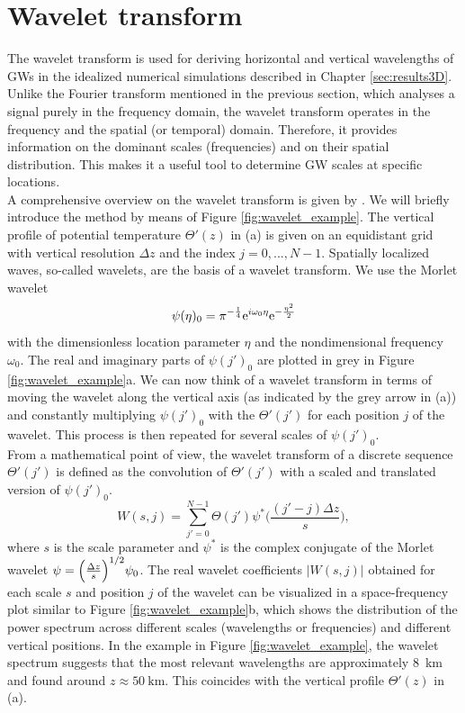 \section{Wavelet transform}
\label{sec:wavelet}
%
The wavelet transform is used for deriving horizontal and vertical wavelengths of GWs in the idealized numerical simulations described in Chapter \ref{sec:results3D}. Unlike the Fourier transform mentioned in the previous section, which analyses a signal purely in the frequency domain, the wavelet transform operates in the frequency and the spatial (or temporal) domain. Therefore, it provides information on the dominant scales (frequencies) and on their spatial distribution. This makes it a useful tool to determine GW scales at specific locations.\\

A comprehensive overview on the wavelet transform is given by \textcite{torrence_practical_1998}. We will briefly introduce the method by means of Figure \ref{fig:wavelet_example}. The vertical profile of potential temperature $\Theta'(z)$ in (a) is given on an equidistant grid with vertical resolution $\Delta z$ and the index $j=0,...,N-1$. Spatially localized waves, so-called wavelets, are the basis of a wavelet transform. We use the Morlet wavelet
\begin{equation}
    \psi(\eta)_0= \pi^{-\frac{1}{4}} {\rm e}^{i \omega_0 \eta}  {\rm e}^{-\frac{\eta^2}{2}}
    \label{equ:morlet}
\end{equation}
with the dimensionless location parameter $\eta$ and the nondimensional frequency $\omega_0$. The real and imaginary parts of $\psi(j')_0$ are plotted in grey in Figure \ref{fig:wavelet_example}a. We can now think of a wavelet transform in terms of moving the wavelet along the vertical axis (as indicated by the grey arrow in (a)) and constantly multiplying $\psi(j')_0$ with the $\Theta'(j')$ for each position $j$ of the wavelet. This process is then repeated for several scales of $\psi(j')_0$.\\ From a mathematical point of view, the wavelet transform of a discrete sequence $\Theta'(j')$ is defined as the convolution of $\Theta'(j')$ with a scaled and translated version of $\psi(j')_0$.
\begin{equation}
    W(s,j)=\sum_{j'=0}^{N-1} \Theta(j') \psi^{*}  \Biggl( \frac{(j'-j) \Delta z}{s}  \Biggr),
    \label{equ:wavelet_transform}
\end{equation}
where $s$ is the scale parameter and $\psi^{*}$ is the complex conjugate of the Morlet wavelet $\psi = \Bigl(\frac{\Delta z}{s} \Bigr)^{1/2} \psi_0$. The real wavelet coefficients $\left| W(s,j) \right|$ obtained for each scale $s$ and position $j$ of the wavelet can be visualized in a space-frequency plot similar to Figure \ref{fig:wavelet_example}b, which shows the distribution of the power spectrum across different scales (wavelengths or frequencies) and different vertical positions. In the example in Figure \ref{fig:wavelet_example}, the wavelet spectrum suggests that the most relevant wavelengths are approximately \SI{8}{\kilo\meter} and found around $z \approx \SI{50}{\kilo\meter}$. This coincides with the vertical profile $\Theta'(z)$ in (a). 

